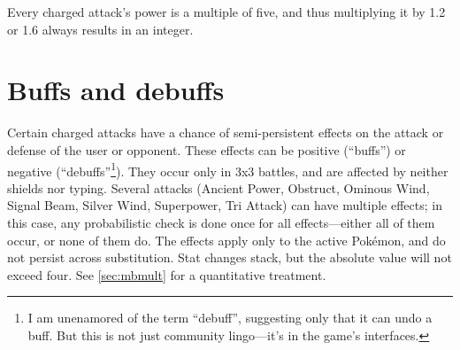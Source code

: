\begin{tipbox}[title=Did you notice?]
Every charged attack's power is a multiple of five, and thus multiplying it by 1.2 or 1.6 always results in an integer.
\end{tipbox}

\section{Buffs and debuffs\label{sec:buffs}}
Certain charged attacks have a chance of semi-persistent effects on the
  attack or defense of the user or opponent.
These effects can be positive (``buffs'') or negative (``debuffs''\footnote{I am unenamored of the term ``debuff'',
  suggesting only that it can undo a buff. But this is not just community lingo---it's in the
  game's interfaces.}).
They occur only in 3x3 battles, and are affected by neither shields nor typing.
Several attacks (Ancient Power, Obstruct, Ominous Wind, Signal Beam, Silver
  Wind, Superpower, Tri Attack) can have multiple effects; in this case, any
  probabilistic check is done once for all effects---either all of them
  occur, or none of them do.
The effects apply only to the active Pokémon, and do not persist across substitution.
Stat changes stack, but the absolute value will not exceed four.
See \autoref{sec:mbmult} for a quantitative treatment.

